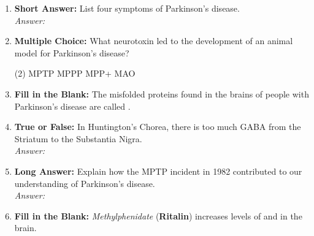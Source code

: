 \begin{enumerate}[label=\textbf{Q3.5.\arabic*}]
    \item \textbf{Short Answer:} List four symptoms of Parkinson's disease. \\
        \textit{Answer:} %

    \item \textbf{Multiple Choice:} What neurotoxin led to the development of an animal model for Parkinson's disease?
        \begin{tasks}[label=\textcolor{\documentTheme}{(\Alph*)}, item-format=\color{\documentTheme}, label-width=1.5em, item-indent=1.7em](2)
            \task MPTP
            \task MPPP
            \task MPP+
            \task MAO
        \end{tasks}

    \item \textbf{Fill in the Blank:} The misfolded proteins found in the brains of people with Parkinson's disease are called \underline{\hspace{3cm}}.

    \item \textbf{True or False:} In Huntington's Chorea, there is too much GABA from the Striatum to the Substantia Nigra. \\
        \textit{Answer:} %

    \item \textbf{Long Answer:} Explain how the MPTP incident in 1982 contributed to our understanding of Parkinson's disease. \\
        \textit{Answer:} \\[2cm] %

    \item \textbf{Fill in the Blank:} \textit{Methylphenidate} (\textbf{Ritalin}) increases levels of \underline{\hspace{3cm}} and \underline{\hspace{3cm}} in the brain.


\end{enumerate}
